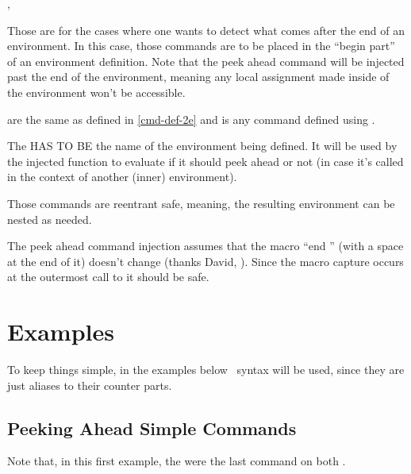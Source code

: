 \documentclass[10pt]{article}
\begin{document}
\begin{codedescribe}{\xpeekEnvCmd, \xpeekEnv}
\begin{codesyntax}%
\end{codesyntax}
Those are for the cases where one wants to detect what comes after the end of an environment. In this case, those commands are to be placed in the ``begin part'' of an environment definition. Note that the peek ahead command will be injected past the end of the environment, meaning any local assignment made inside of the environment won't be accessible. 

 are the same as defined in \ref{cmd-def-2e} and  is any command defined using \tsobj[code,sep=or]{\xpeekSetCmd, \xpeekSetCmdGlobal}.
\end{codedescribe}
\begin{tsremark}
  The  HAS TO BE the name of the environment being defined. It will be used by the injected function to evaluate if it should peek ahead or not (in case it's called in the context of another (inner) environment).
\end{tsremark}
\begin{tsremark}
  Those commands are reentrant safe, meaning, the resulting environment can be nested as needed.
\end{tsremark}
\begin{tsremark}
  The peek ahead command injection assumes that the macro ``end '' (with a space at the end of it) doesn't change (thanks David, \cite{stackexchange}). Since the macro capture  occurs at the outermost call to \tsobj[code,sep=or]{\xpeekEnv,\xpeekEnvCmd} it should be safe.

\end{tsremark}

\newpage 

\section{Examples}

To keep things simple, in the examples below \LaTeXe\ syntax will be used, since they are just aliases to their  counter parts. 

\subsection{Peeking Ahead Simple Commands}
Note that, in this first example, the \tsobj{\xpeekTok,\xpeekTokCmd} were the last command on  both \tsobj{\cmdA,\cmdB}.
\end{document}
